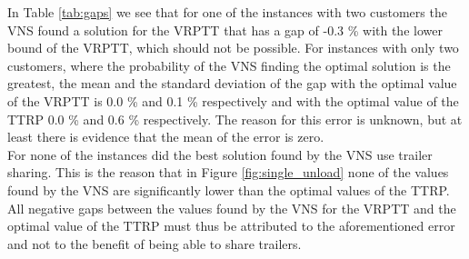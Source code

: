 
In Table \ref{tab:gaps} we see that for one of the instances with two customers the VNS found a solution for the VRPTT that has a gap of -0.3 \% with the lower bound of the VRPTT, which should not be possible.
For instances with only two customers, where the probability of the VNS finding the optimal solution is the greatest, the mean and the standard deviation of the gap with the optimal value of the VRPTT is 0.0 \% and 0.1 \% respectively and with the optimal value of the TTRP 0.0 \% and 0.6 \% respectively.
The reason for this error is unknown, but at least there is evidence that the mean of the error is zero. \\


For none of the instances did the best solution found by the VNS use trailer sharing.
This is the reason that in Figure \ref{fig:single_unload} none of the values found by the VNS are significantly lower than the optimal values of the TTRP.
All negative gaps between the values found by the VNS for the VRPTT and the optimal value of the TTRP must thus be attributed to the aforementioned error and not to the benefit of being able to share trailers. \\

